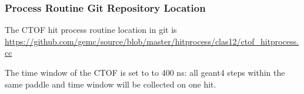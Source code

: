 \subsubsection{Process Routine Git Repository Location}
The CTOF hit process routine location in git is \url{https://github.com/gemc/source/blob/master/hitprocess/clas12/ctof_hitprocess.cc}

The time window  of the CTOF is set to to 400 ns: all geant4 steps within the same paddle and time window will be collected on one hit.
